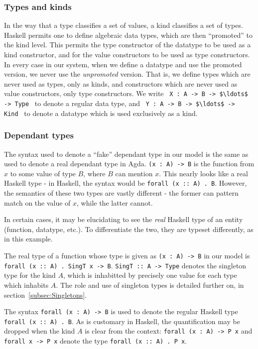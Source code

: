 \documentclass[12pt, svgnames]{article}
\let\Oldsubsubsection\subsubsection
\renewcommand{\subsubsection}{\FloatBarrier\Oldsubsubsection}
\begin{document}
\subsubsection*{Types and kinds}
In the way that a type classifies a set of values, a kind classifies a set of
types. Haskell permits one to define algebraic data types, which are then ``promoted''
to the kind level. This permits the type constructor of the datatype to be used
as a kind constructor, and for the value constructors to be used as type constructors. 
In every case in our system, when we define a datatype and use the promoted version,
we never use the \emph{unpromoted} version. That is, we define types which are never
used as types, only as kinds, and constructors which are never used as value constructors,
only type constructors. We write \,\,\,\lstinline!X : A -> B -> $\ldots$ -> Type!\,\,\, to denote
a regular data type, and \,\,\,\lstinline!Y : A -> B -> $\ldots$ -> Kind!\,\,\, to denote a datatype
which is used exclusively as a kind. 

\subsubsection*{Dependant types}
The syntax used to denote a ``fake'' dependant type in our model is the same 
as used to denote a real dependant type in Agda. \lstinline!(x : A) -> B! is the function
from $x$ to some value of type $B$, where $B$ can mention $x$. This nearly looks like a 
real Haskell type - in Haskell, the syntax would be \texttt{forall (x :: A) . B}. However, 
the semantics of these two types are vastly different - the former can pattern match
on the value of $x$, while the latter cannot. 

In certain cases, it may be elucidating to see the \emph{real} Haskell type of
an entity (function, datatype, etc.). To differentiate the two, they are typeset
differently, as in this example.

The real type of a function whose type is given as \lstinline!(x : A) -> B! in
our model is \texttt{forall (x :: A) . SingT x -> B}. \texttt{SingT :: A -> Type}
denotes the singleton type for the kind $A$, which is inhabitted by precisely
one value for each type which inhabits $A$. The role and use of singleton types
is detailed further on, in section~\ref{subsec:Singletons}. 

The syntax \lstinline!forall (x : A) -> B! is used to denote the regular
Haskell type \texttt{forall (x :: A) . B}. As is customary in Haskell, the quantification
may be dropped when the kind $A$ is clear from the context: \lstinline!forall (x : A) -> P x! and
\lstinline!forall x -> P x! denote the type \texttt{forall (x :: A) . P x}.
\end{document}

